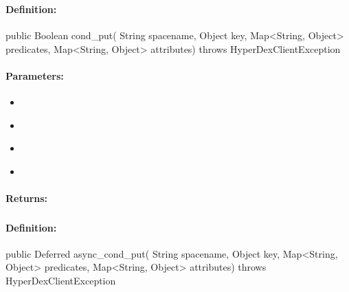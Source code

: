 \subsubsection{}
\label{api:java:cond_put}


\paragraph{Definition:}
\begin{javacode}
public Boolean cond_put(
        String spacename,
        Object key,
        Map<String, Object> predicates,
        Map<String, Object> attributes) throws HyperDexClientException
\end{javacode}

\paragraph{Parameters:}
\begin{itemize}[noitemsep]
\item {}\\

\item {}\\

\item {}\\

\item {}\\

\end{itemize}

\paragraph{Returns:}


\pagebreak
\subsubsection{}
\label{api:java:async_cond_put}


\paragraph{Definition:}
\begin{javacode}
public Deferred async_cond_put(
        String spacename,
        Object key,
        Map<String, Object> predicates,
        Map<String, Object> attributes) throws HyperDexClientException
\end{javacode}

